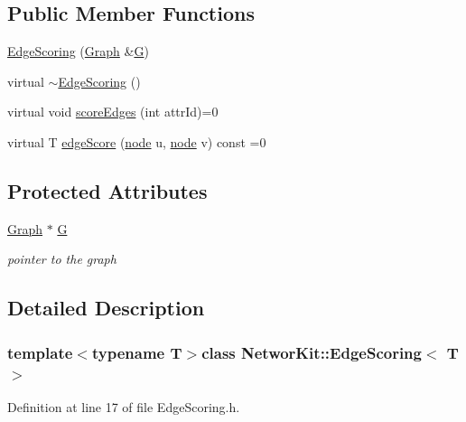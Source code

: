 \subsection*{Public Member Functions}
\begin{DoxyCompactItemize}
\item 
\hyperlink{class_networ_kit_1_1_edge_scoring_a4dc61d79d58927d0354657b4984d6277}{Edge\-Scoring} (\hyperlink{class_networ_kit_1_1_graph}{Graph} \&\hyperlink{class_networ_kit_1_1_edge_scoring_a236d40c30ccbb022125d3dc915865d8a}{G})
\item 
virtual \hyperlink{class_networ_kit_1_1_edge_scoring_ab36424d9d938568d6a478c718cf7c508}{$\sim$\-Edge\-Scoring} ()
\item 
virtual void \hyperlink{class_networ_kit_1_1_edge_scoring_a51bb5124be2834ac097ff8d65f63880d}{score\-Edges} (int attr\-Id)=0
\item 
virtual T \hyperlink{class_networ_kit_1_1_edge_scoring_a4e1bac0c08710b103fad6d944c437d74}{edge\-Score} (\hyperlink{namespace_networ_kit_a61914158fd771265be48de9942369160}{node} u, \hyperlink{namespace_networ_kit_a61914158fd771265be48de9942369160}{node} v) const =0
\end{DoxyCompactItemize}
\subsection*{Protected Attributes}
\begin{DoxyCompactItemize}
\item 
\hyperlink{class_networ_kit_1_1_graph}{Graph} $\ast$ \hyperlink{class_networ_kit_1_1_edge_scoring_a236d40c30ccbb022125d3dc915865d8a}{G}
\begin{DoxyCompactList}\small\item\em pointer to the graph \end{DoxyCompactList}\end{DoxyCompactItemize}


\subsection{Detailed Description}
\subsubsection*{template$<$typename T$>$class Networ\-Kit\-::\-Edge\-Scoring$<$ T $>$}



Definition at line 17 of file Edge\-Scoring.\-h.



